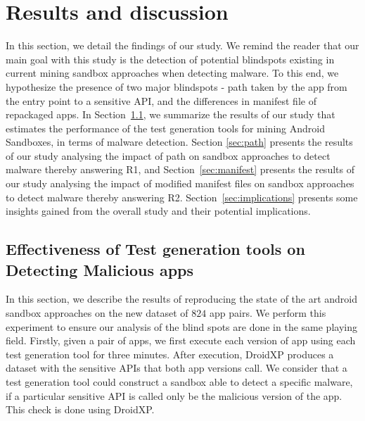 \section{Results and discussion}\label{sec:results}

In this section, we detail the findings of our study.  We remind the reader that our main goal with this study is the detection of potential blindspots existing in current mining sandbox approaches when detecting malware. To this end, we hypothesize the presence of two major blindspots - path taken by the app from the entry point to a sensitive API, and the differences in manifest file of repackaged apps. In Section~\ref{sec:testGeneration}, we summarize the results of our study that estimates the performance of the test generation tools for mining Android  Sandboxes, in terms of malware detection. Section \ref{sec:path} presents the results of our study analysing the impact of path on sandbox approaches to detect malware thereby answering R1, and Section~\ref{sec:manifest} presents the results of our study analysing the impact of modified manifest files on sandbox approaches to detect malware thereby answering R2. Section~\ref{sec:implications} presents some insights gained from the overall study and their potential implications.

\subsection{Effectiveness of Test generation tools on Detecting Malicious apps}\label{sec:testGeneration}


In this section, we describe the results of reproducing the state of the art android sandbox approaches on the new dataset of $824$ app pairs. We perform this experiment to ensure our analysis of the blind spots are done in the same playing field. 
Firstly, given a pair of apps, we first execute each version of app using each test generation tool for three minutes. After execution, DroidXP produces a dataset with the sensitive APIs that both app versions call. We consider that a test generation tool could construct a sandbox able to detect a specific malware, if a particular sensitive API is called only be the malicious version of the app. This check is done using DroidXP. 

